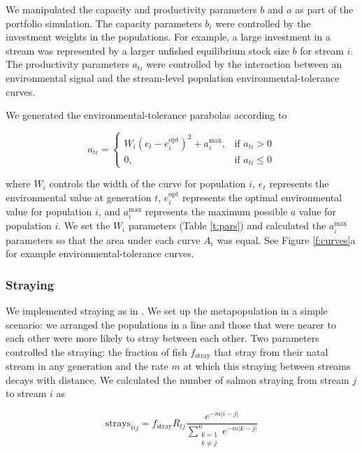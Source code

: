 We manipulated the capacity and productivity parameters $b$ and $a$ as
part of the portfolio simulation. The capacity parameters $b_i$ were
controlled by the investment weights in the populations. For example, a
large investment in a stream was represented by a larger unfished
equilibrium stock size $b$ for stream $i$. The productivity parameters
$a_{ti}$ were controlled by the interaction between an environmental
signal and the stream-level population environmental-tolerance curves.

We generated the environmental-tolerance parabolas according to

\begin{equation}
  a_{ti} =
  \begin{cases}
    W_i (e_t - e_i^{\mathrm{opt}})^2 + a_i^{\mathrm{max}},
      & \text{if } a_{ti} > 0\\
      0, & \text{if } a_{ti} \leq 0
  \end{cases}
\end{equation}

\noindent where $W_i$ controls the width of the curve for population
$i$, $e_t$ represents the environmental value at generation $t$,
$e_i^{\mathrm{opt}}$ represents the optimal environmental value for
population $i$, and $a_i^{\mathrm{max}}$ represents the maximum possible
$a$ value for population $i$. We set the $W_i$ parameters (Table
\ref{t:pars}) and calculated the $a_i^{\mathrm{max}}$ parameters so that
the area under each curve $A_i$ was equal. See Figure \ref{f:curves}a
for example environmental-tolerance curves.

\subsubsection{Straying}

We implemented straying as in \citet{cooper1999}. We set up the
metapopulation in a simple scenario: we arranged the populations in a
line and those that were nearer to each other were more likely to stray
between each other. Two parameters controlled the straying: the fraction
of fish $f_{\mathrm{stray}}$ that stray from their natal stream in any
generation and the rate $m$ at which this straying between streams
decays with distance. We calculated the number of salmon straying from
stream $j$ to stream $i$ as

\begin{equation}
  \mathrm{strays}_{tij} = f_{\mathrm{stray}} R_{tj}
    \frac{e^{-m \lvert i-j \rvert }}
      {\displaystyle\sum\limits_{\substack{k = 1 \\
    k \neq j}}^{n} e^{-m \lvert k-j \rvert }}
  \label{eq:stray}
\end{equation}

